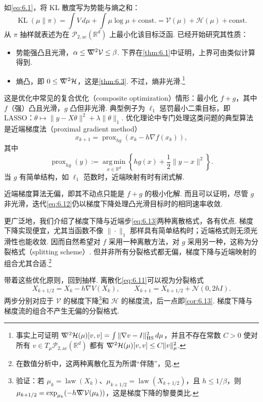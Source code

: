 如\eqref{eq:6.1}，将 KL 散度写为势能与熵之和：
$$
\operatorname{KL}(\mu\|\pi)=\int V\,d\mu+\int\mu\log\mu+\mathrm{const.}
=\mathcal V(\mu)+\mathcal H(\mu)+\mathrm{const.}
$$
从 $\pi$ 抽样就表述为在 $\mathcal P_{2,\mathrm{ac}}(\mathbb R^d)$ 上最小化该目标泛函. 已经开始研究其性质：
\begin{itemize}
\item 势能强凸且光滑，$\alpha\leq\nabla\mkern-10mu\nabla^2\mathcal V\leq\beta$. 下界在\autoref{thm:6.1}中证明，上界可由类似计算得到.
\item 熵凸，即 $0\leq\nabla\mkern-10mu\nabla^2\mathcal H$，这是\autoref{thm:6.3}. 不过，熵非光滑.\footnote{事实上可证明 $\nabla\mkern-10mu\nabla^2\mathcal H(\mu)[v,v]=\int\|\nabla v-I\|_{\mathrm{HS}}^2\,d\mu$，并且不存在常数 $C>0$ 使对所有 $v\in T_\mu\mathcal P_{2,\mathrm{ac}}(\mathbb R^d)$ 都有 $\nabla\mkern-10mu\nabla^2\mathcal H(\mu)[v,v]\leq C\|v\|_\mu^2$.}
\end{itemize}
这是优化中常见的复合优化（composite optimization）情形：最小化 $f+g$，其中 $f$（强）凸且光滑，$g$ 凸但非光滑. 典型例子为 $\ell_1$ 惩罚最小二乘目标，即 LASSO：$\theta\mapsto\|y-X\theta\|^2+\lambda\|\theta\|_1$. 优化理论中专门处理这类问题的典型算法是近端梯度法（proximal gradient method）
\begin{equation}\label{eq:6.12}
x_{k+1}=\operatorname{prox}_{hg}(x_k-h\nabla f(x_k)),
\end{equation}
其中
\begin{equation}\label{eq:6.13}
\operatorname{prox}_{hg}(y):=\operatorname*{arg\,min}_{x\in\mathbb R^d}
\left\{hg(x)+\frac12\|y-x\|^2\right\}.
\end{equation}
当 $g$ 有简单结构，如 $\ell_1$ 范数时，近端映射有时有闭式解.

近端梯度算法无偏，即其不动点只能是 $f+g$ 的极小化解. 而且可以证明，尽管 $g$ 非光滑，迭代\eqref{eq:6.12}仍以梯度下降处理凸光滑目标时的相同速率收敛.

更广泛地，我们介绍了梯度下降与近端步\eqref{eq:6.13}两种离散格式，各有优点. 梯度下降实现便宜，尤其当函数不像 $\|\cdot\|_1$ 那样具有简单结构时；近端格式则无须光滑性也能收敛. 因而自然希望对 $f$ 采用一种离散方法，对 $g$ 采用另一种，这称为分裂格式（splitting scheme）. 但并非所有分裂格式都无偏，梯度下降与近端映射的组合尤其合适.\footnote{在数值分析中，这两种离散化互为所谓“伴随”，见\cite[附录 B]{ref324}.}

带着这些优化原则，回到抽样. 离散化\eqref{eq:6.11}可以视为分裂格式
$$
X_{k+1/2}=X_k-h\nabla V(X_k),\qquad
X_{k+1}=X_{k+1/2}+\mathcal N(0,2hI).
$$
两步分别对应于 $\mathcal V$ 的梯度下降\footnote{验证：若 $\mu_k=\operatorname{law}(X_k)$、$\mu_{k+1/2}=\operatorname{law}(X_{k+1/2})$，且 $h\leq1/\beta$，则 $\mu_{k+1/2}=\exp_{\mu_k}(-h\nabla\mkern-10mu\nabla\mathcal V(\mu_k))$，这是梯度下降的黎曼类比.}和 $\mathcal H$ 的梯度流，后一点即\autoref{cor:6.13}. 梯度下降与梯度流的组合不产生无偏的分裂格式.

